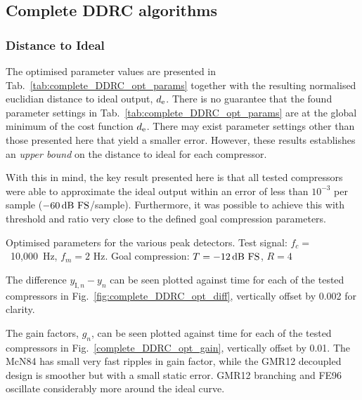 \documentclass[../main2.tex]{subfiles}
\providecommand{\rootdir}{..}
\begin{document}
\subsection{Complete DDRC algorithms}

\subsubsection{Distance to Ideal}
The optimised parameter values are presented in Tab.~\ref{tab:complete_DDRC_opt_params} together with the resulting normalised euclidian distance to ideal output, $d_\text{e}$. There is no guarantee that the found parameter settings in Tab.~\ref{tab:complete_DDRC_opt_params} are at the global minimum of the cost function $d_\text{e}$. There may exist parameter settings other than those presented here that yield a smaller error. However, these results establishes an \emph{upper bound} on the distance to ideal for each compressor.

With this in mind, the key result presented here is that all tested compressors were able to approximate the ideal output within an error of less than $10^{-3}$ per sample ($-60 \mskip3mu\text{dB FS}$/sample). Furthermore, it was possible to achieve this with threshold and ratio very close to the defined goal compression parameters.

\begin{table}[h]
\small
\begin{center}
\caption{Optimised parameters for the various peak detectors. Test signal: $f_c=$~10,000~Hz, $f_m=2$ Hz. Goal compression: $T=-12 \mskip3mu\text{dB FS}$, $R=4$}
\label{tab:complete_DDRC_opt_params}

\end{center}
\end{table}

The difference $y_{\text{I},n} - y_n$ can be seen plotted against time for each of the tested compressors in Fig.~\ref{fig:complete_DDRC_opt_diff}, vertically offset by 0.002 for clarity.

The gain factors, $g_n$, can be seen plotted against time for each of the tested compressors in Fig.~\ref{complete_DDRC_opt_gain}, vertically offset by 0.01. The McN84 has small very fast ripples in gain factor, while the GMR12 decoupled design is smoother but with a small static error. GMR12 branching and FE96 oscillate considerably more around the ideal curve.
\end{document}

